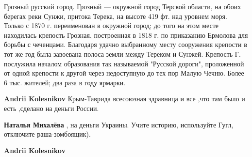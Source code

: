 \begin{itemize}
\begin{itemize}
Грозный русский город. Грозный — окружной город Терской области, на обоих
берегах реки Сунжи, притока Терека, на высоте 419 фт. над уровнем моря. Только
с 1870 г. переименован в окружной город; до того на этом месте находилась
крепость Грозная, построенная в 1818 г. по приказанию Ермолова для борьбы с
чеченцами. Благодаря удачно выбранному месту сооружения крепости в тот же год
была завоевана полоса земли между Тереком и Сунжей. Крепость Г. послужила
началом образования так называемой "Русской дороги", проложенной от одной
крепости к другой через недоступную до тех пор Малую Чечню. Более 6 тыс.
жителей; два раза в году ярмарки.


\textbf{Andrii Kolesnikov} Крым-Таврида всесоюзная здравница и все ,что там было и есть ,сделано на деньги России.

\textbf{Наталья Михалёва} , на деньги Украины. Учите историю, используйте Гугл, отключите раша-зомбоящик).

\textbf{Andrii Kolesnikov} 


\end{itemize}
\end{itemize}
